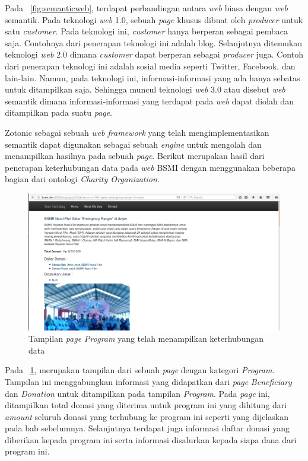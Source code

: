 Pada \pic~\ref{fig:semanticweb}, terdapat perbandingan antara \textit{web} biasa dengan \textit{web} semantik. Pada teknologi \textit{web} 1.0, sebuah \textit{page} khusus dibuat oleh \textit{producer} untuk satu \textit{customer}. Pada teknologi ini, \textit{customer} hanya berperan sebagai pembaca saja. Contohnya dari penerapan teknologi ini adalah blog. Selanjutnya ditemukan teknologi \textit{web} 2.0 dimana \textit{customer} dapat berperan sebagai \textit{producer} juga. Contoh dari penerapan teknologi ini adalah sosial media seperti Twitter, Facebook, dan lain-lain. Namun, pada teknologi ini, informasi-informasi yang ada hanya sebatas untuk ditampilkan saja. Sehingga muncul teknologi \textit{web} 3.0 atau disebut \textit{web} semantik dimana informasi-informasi yang terdapat pada \textit{web} dapat diolah dan ditampilkan pada suatu \textit{page}.

Zotonic sebagai sebuah \textit{web framework} yang telah mengimplementasikan semantik dapat digunakan sebagai sebuah \textit{engine} untuk mengolah dan menampilkan hasilnya pada sebuah \textit{page}. Berikut merupakan hasil dari penerapan keterhubungan data pada \textit{web} BSMI dengan menggunakan beberapa bagian dari ontologi \textit{Charity Organization}.


\begin{figure}
	\centering
	\includegraphics[width=1\textwidth]
	{pics/100-program.png}
	\caption{Tampilan \textit{page Program} yang telah menampilkan keterhubungan data}
	\label{fig:programlinked}
\end{figure}
\vspace{-0.3cm}

Pada \pic~\ref{fig:programlinked}, merupakan tampilan dari sebuah \textit{page} dengan kategori \textit{Program}. Tampilan ini menggabungkan informasi yang didapatkan dari \textit{page} \textit{Beneficiary} dan \textit{Donation} untuk ditampilkan pada tampilan \textit{Program}. Pada \textit{page} ini, ditampilkan total donasi yang diterima untuk program ini yang dihitung dari \textit{amount} seluruh donasi yang terhubung ke program ini seperti yang dijelaskan pada bab sebelumnya. Selanjutnya terdapat juga informasi daftar donasi yang diberikan kepada program ini serta informasi disalurkan kepada siapa dana dari program ini.

